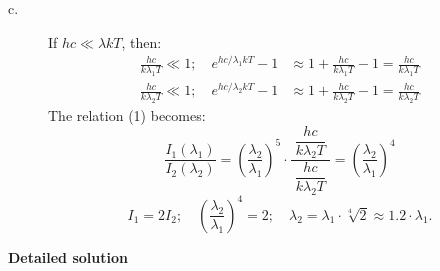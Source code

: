 \begin{description}
\item[c.] If $hc \ll \lambda k T$, then:
\begin{align*}
\frac{hc}{k\lambda_1 T} \ll 1;\quad
e^{hc/\lambda_1 k T} - 1 &\approx 1 + \frac{hc}{k\lambda_1 T} - 1
  = \frac{hc}{k\lambda_1 T}\\
\frac{hc}{k\lambda_2 T} \ll 1;\quad
e^{hc/\lambda_2 k T} - 1 &\approx 1 + \frac{hc}{k\lambda_2 T} - 1
  = \frac{hc}{k\lambda_2 T}
\end{align*}
The relation (1) becomes:
\[
\frac{I_1(\lambda_1)}{I_2(\lambda_2)}
  = \left( \frac{\lambda_2}{\lambda_1} \right)^{\!5}
    \cdot \frac{\;\dfrac{hc}{k\lambda_2 T}\;}{\dfrac{hc}{k\lambda_2 T}}
  = \left( \frac{\lambda_2}{\lambda_1} \right)^{\!4}
\]
\[
I_1 = 2 I_2;\quad
\left( \frac{\lambda_2}{\lambda_1} \right)^{\!4} = 2;\quad
\lambda_2 = \lambda_1 \cdot \sqrt[4]{2} \approx 1.2 \cdot \lambda_1.
\]
\end{description}

\textbf{Detailed solution}

